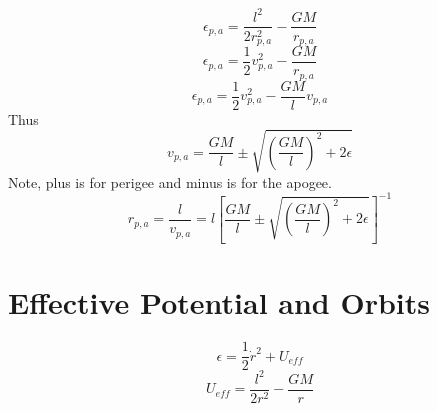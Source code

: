 \documentclass{article}
\newtheorem{one minute paper}[theorem]{One Minute Paper}
\begin{document}
\begin{enumerate}
\begin{equation}
        \epsilon_{p,a} = \frac{l^2}{2r_{p,a}^2} - \frac{GM}{r_{p,a}}
    \end{equation}
    \begin{equation}
        \epsilon_{p,a} = \frac{1}{2}v_{p,a}^2 - \frac{GM}{r_{p,a}}
    \end{equation}
    \begin{equation}
        \epsilon_{p,a} = \frac{1}{2}v_{p,a}^2 - \frac{GM}{l}v_{p,a}
    \end{equation}
    Thus 
    \begin{equation}
        v_{p,a} = \frac{GM}{l} \pm \sqrt{(\frac{GM}{l})^2 + 2\epsilon}
    \end{equation}
    Note, plus is for perigee and minus is for the apogee. 
    \begin{equation}
        r_{p,a} = \frac{l}{v_{p,a}} = l\left[\frac{GM}{l} \pm \sqrt{(\frac{GM}{l})^2 + 2\epsilon}\right]^{-1}
    \end{equation}
\end{enumerate}

\section*{Effective Potential and Orbits}

\begin{equation}
    \epsilon = \frac{1}{2}\dot{r}^2 + U_{eff}
\end{equation}
\begin{equation}
    U_{eff} = \frac{l^2}{2r^2} - \frac{GM}{r}
\end{equation}
\end{document}
